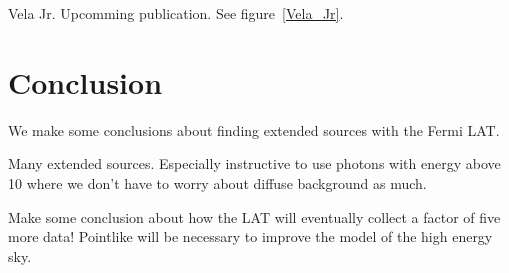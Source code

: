 \documentclass[preprint]{aastex}
\newcommand{\gev}{\text{GeV}\xspace}
\begin{document}
Vela Jr. Upcomming publication.
See figure~\ref{Vela_Jr}.

\section{Conclusion}

We make some conclusions about finding extended
sources with the Fermi LAT.

Many extended sources. Especially instructive to
use photons with energy above 10 \gev where we don't have
to worry about diffuse background as much.

Make some conclusion about how the LAT will eventually collect a factor
of five more data! Pointlike will be necessary to improve the model of the
high energy sky.




\appendix
\end{document}
